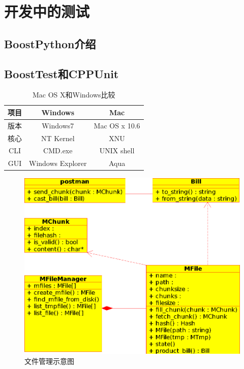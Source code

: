 \chapter{开发中的测试}
\section{BoostPython介绍}
\section{BoostTest和CPPUnit}

\begin{table}
	\center
	\caption{Mac OS X和Windows比较}
	\begin{tabular}[t!]{ccc}
	\hline
	项目 & Windows & Mac \\
	\hline
	版本 & Windows7 & Mac OS x 10.6 \\
	核心 & NT Kernel & XNU \\
	CLI  & CMD.exe & UNIX shell \\
	GUI  &  Windows Explorer & Aqua \\
	\hline
\end{tabular}
\end{table}

\begin{figure}
	\includegraphics{figure/filemanger.eps}
	\caption{文件管理示意图}
\end{figure}
